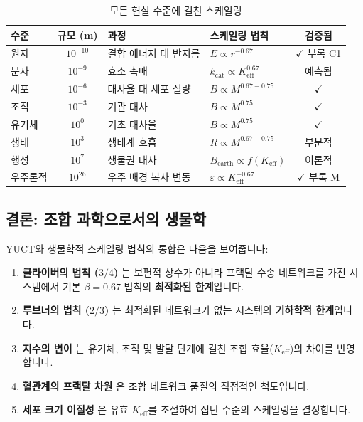 \documentclass[11pt,a4paper]{article}
\newcommand{\Keff}{K_{\mathrm{eff}}}
\begin{document}
	\begin{table}[htbp]
		\centering
		\caption{모든 현실 수준에 걸친 스케일링}
		\label{tab:unified-hierarchy}
		\begin{tabular}{p{3cm} c p{4cm} p{3cm} c}
			\toprule
			\textbf{수준} & \textbf{규모 (m)} & \textbf{과정} & \textbf{스케일링 법칙} & \textbf{검증됨} \\
			\midrule
			원자 & \(10^{-10}\) & 결합 에너지 대 반지름 & \(E \propto r^{-0.67}\) & \(\checkmark\) 부록 C1 \\
			분자 & \(10^{-9}\) & 효소 촉매 & \(k_{\text{cat}} \propto \Keff^{0.67}\) & 예측됨 \\
			세포 & \(10^{-6}\) & 대사율 대 세포 질량 & \(B \propto M^{0.67-0.75}\) & \(\checkmark\) \cite{Takemoto2015} \\
			조직 & \(10^{-3}\) & 기관 대사 & \(B \propto M^{0.75}\) & \(\checkmark\) \cite{West2002} \\
			유기체 & \(10^{0}\) & 기초 대사율 & \(B \propto M^{0.75}\) & \(\checkmark\) \cite{Kleiber1932} \\
			생태 & \(10^{3}\) & 생태계 호흡 & \(R \propto M^{0.67-0.75}\) & 부분적 \\
			행성 & \(10^{7}\) & 생물권 대사 & \(B_{\text{earth}} \propto f(\Keff)\) & 이론적 \\
			우주론적 & \(10^{26}\) & 우주 배경 복사 변동 & \(\varepsilon \propto \Keff^{-0.67}\) & \(\checkmark\) 부록 M \\
			\bottomrule
		\end{tabular}
	\end{table}
	
	\subsection{결론: 조합 과학으로서의 생물학}
	
	YUCT와 생물학적 스케일링 법칙의 통합은 다음을 보여줍니다:
	\begin{enumerate}
		\item \textbf{클라이버의 법칙 (\(3/4\))} 는 보편적 상수가 아니라 프랙탈 수송 네트워크를 가진 시스템에서 기본 \(\beta = 0.67\) 법칙의 \textbf{최적화된 한계}입니다.
		\item \textbf{루브너의 법칙 (\(2/3\))} 는 최적화된 네트워크가 없는 시스템의 \textbf{기하학적 한계}입니다.
		\item \textbf{지수의 변이} 는 유기체, 조직 및 발달 단계에 걸친 조합 효율(\(\Keff\))의 차이를 반영합니다.
		\item \textbf{혈관계의 프랙탈 차원} 은 조합 네트워크 품질의 직접적인 척도입니다.
		\item \textbf{세포 크기 이질성} 은 유효 \(\Keff\)를 조절하여 집단 수준의 스케일링을 결정합니다.
	\end{enumerate}
	
\end{document}
